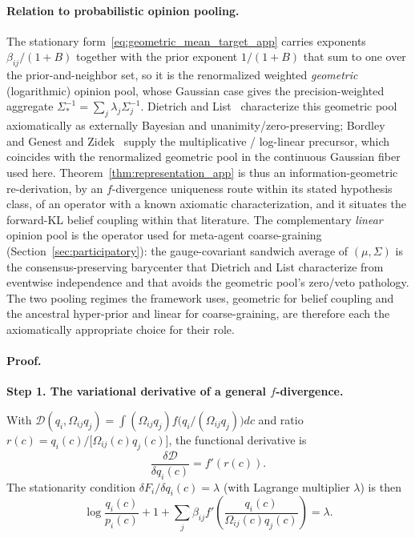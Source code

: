 \documentclass[11pt]{article}
\begin{document}
\paragraph{Relation to probabilistic opinion pooling.} The stationary form~\eqref{eq:geometric_mean_target_app} carries exponents $\beta_{ij}/(1+B)$ together with the prior exponent $1/(1+B)$ that sum to one over the prior-and-neighbor set, so it is the renormalized weighted \emph{geometric} (logarithmic) opinion pool, whose Gaussian case gives the precision-weighted aggregate $\Sigma_*^{-1} = \sum_j \lambda_j \Sigma_j^{-1}$. Dietrich and List~\cite{dietrich2016probabilistic} characterize this geometric pool axiomatically as externally Bayesian and unanimity/zero-preserving; Bordley~\cite{bordley1982multiplicative} and Genest and Zidek~\cite{GenestZidek1986} supply the multiplicative / log-linear precursor, which coincides with the renormalized geometric pool in the continuous Gaussian fiber used here. Theorem~\ref{thm:representation_app} is thus an information-geometric re-derivation, by an $f$-divergence uniqueness route within its stated hypothesis class, of an operator with a known axiomatic characterization, and it situates the forward-KL belief coupling within that literature. The complementary \emph{linear} opinion pool is the operator used for meta-agent coarse-graining (Section~\ref{sec:participatory}): the gauge-covariant sandwich average of $(\mu, \Sigma)$ is the consensus-preserving barycenter that Dietrich and List characterize from eventwise independence and that avoids the geometric pool's zero/veto pathology. The two pooling regimes the framework uses, geometric for belief coupling and the ancestral hyper-prior and linear for coarse-graining, are therefore each the axiomatically appropriate choice for their role.

\paragraph{Proof.}

\textbf{Step 1. The variational derivative of a general $f$-divergence.}

With $\mathcal{D}(q_i,\Omega_{ij}q_j)=\int (\Omega_{ij}q_j)f\bigl(q_i/(\Omega_{ij}q_j)\bigr)dc$ and ratio $r(c)=q_i(c)/\bigl[\Omega_{ij}(c)q_j(c)\bigr]$, the functional derivative is
\begin{equation}
\frac{\delta\mathcal{D}}{\delta q_i(c)} = f'(r(c)).
\end{equation}
The stationarity condition $\delta F_i/\delta q_i(c)=\lambda$ (with Lagrange multiplier $\lambda$) is then
\begin{equation}
\log\frac{q_i(c)}{p_i(c)} + 1
+ \sum_j \beta_{ij}f'\left(\frac{q_i(c)}{\Omega_{ij}(c)q_j(c)}\right) = \lambda.
\label{eq:general_stationarity_app}
\end{equation}
\end{document}
